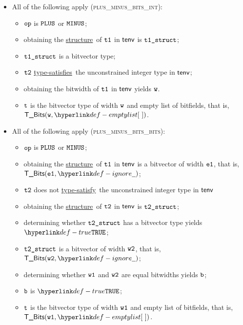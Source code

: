 \documentclass{book}
\newcommand\ProseOrTypeError[0]{\ProseTerminateAs{\TypeErrorConfig}}
\newcommand\structure[0]{\hyperlink{def-structure}{structure}}
\newcommand\typesatisfies[0]{\hyperlink{def-typesatisfies}{type-satisfies}}
\newcommand\typesatisfy[0]{\hyperlink{def-typesatisfies}{type-satisfy}}
\begin{document}
\begin{itemize}
  \item All of the following apply (\textsc{plus\_minus\_bits\_int}):
  \begin{itemize}
    \item $\texttt{op}$ is $\texttt{PLUS}$ or $\texttt{MINUS}$;
    \item obtaining the \structure\ of $\texttt{t1}$ in $\textsf{tenv}$ is $\texttt{t1\_struct}$\ProseOrTypeError;
    \item $\texttt{t1\_struct}$ is a bitvector type;
    \item $\texttt{t2}$ \typesatisfies\ the unconstrained integer type in $\textsf{tenv}$;
    \item obtaining the bitwidth of $\texttt{t1}$ in $\textsf{tenv}$ yields $\texttt{w}$.
    \item $\texttt{t}$ is the bitvector type of width $\texttt{w}$ and empty list of bitfields, that is, \\ $\TBits(\vw, \emptylist)$.
  \end{itemize}

  \item All of the following apply (\textsc{plus\_minus\_bits\_bits}):
  \begin{itemize}
    \item $\texttt{op}$ is $\texttt{PLUS}$ or $\texttt{MINUS}$;
    \item obtaining the \structure\ of $\texttt{t1}$ in $\textsf{tenv}$ is a bitvector of width $\texttt{e1}$, that is,\\ $\TBits(\veone, \Ignore)$;
    \item $\texttt{t2}$ does not \typesatisfy\ the unconstrained integer type in $\textsf{tenv}$
    \item obtaining the \structure\ of $\texttt{t2}$ in $\textsf{tenv}$ is $\texttt{t2\_struct}$\ProseOrTypeError;
    \item determining whether $\texttt{t2\_struct}$ has a bitvector type yields $\True$\ProseOrTypeError;
    \item $\texttt{t2\_struct}$ is a bitvector of width $\texttt{w2}$, that is, $\TBits(\vwtwo, \Ignore)$;
    \item determining whether $\texttt{w1}$ and $\texttt{w2}$ are equal bitwidths yields $\texttt{b}$;
    \item $\texttt{b}$ is $\True$\ProseOrTypeError;
    \item $\texttt{t}$ is the bitvector type of width $\texttt{w1}$ and empty list of bitfields, that is, \\ $\TBits(\vwone, \emptylist)$.
  \end{itemize}


\end{itemize}
\end{document}
